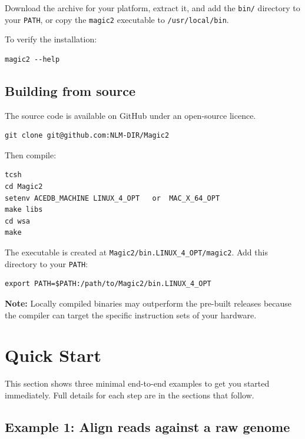 \documentclass[11pt]{article}
\newcommand{\code}[1]{\texttt{#1}}
\begin{document}
Download the archive for your platform, extract it, and add the
\code{bin/} directory to your \code{PATH}, or copy the \code{magic2}
executable to \code{/usr/local/bin}.

To verify the installation:
\begin{lstlisting}
magic2 --help
\end{lstlisting}

\subsection{Building from source}

The source code is available on GitHub under an open-source licence.

\begin{lstlisting}
git clone git@github.com:NLM-DIR/Magic2
\end{lstlisting}

Then compile:
\begin{lstlisting}
tcsh
cd Magic2
setenv ACEDB_MACHINE LINUX_4_OPT   or  MAC_X_64_OPT
make libs
cd wsa
make
\end{lstlisting}

The executable is created at \code{Magic2/bin.LINUX\_4\_OPT/magic2}.
Add this directory to your \code{PATH}:
\begin{lstlisting}
export PATH=$PATH:/path/to/Magic2/bin.LINUX_4_OPT
\end{lstlisting}

\begin{notebox}
\textbf{Note:} Locally compiled binaries may outperform the pre-built
releases because the compiler can target the specific instruction sets
of your hardware.
\end{notebox}

\section{Quick Start}

This section shows three minimal end-to-end examples to get you started
immediately.  Full details for each step are in the sections that follow.

\subsection{Example 1: Align reads against a raw genome}
\end{document}
